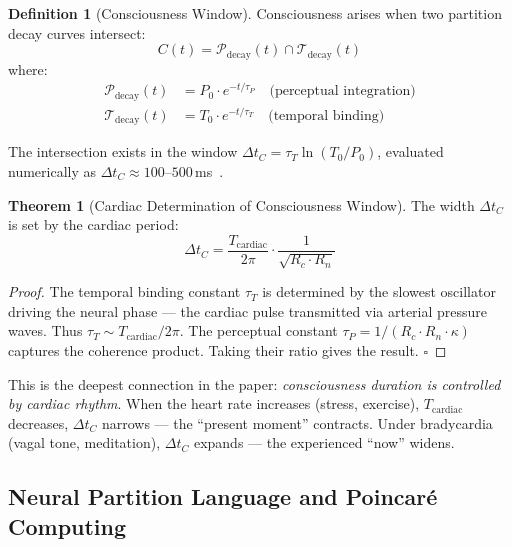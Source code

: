 \documentclass[10pt,twocolumn,a4paper]{article}
\theoremstyle{definition}
\newtheorem{theorem}{Theorem}
\newtheorem{definition}{Definition}
\begin{document}
\begin{definition}[Consciousness Window]
Consciousness arises when two partition decay curves intersect:
\begin{equation}
\boxed{C(t) = \mathcal{P}_{\text{decay}}(t) \cap \mathcal{T}_{\text{decay}}(t)}
\end{equation}
where:
\begin{align}
\mathcal{P}_{\text{decay}}(t) &= P_0 \cdot e^{-t/\tau_P} \quad \text{(perceptual integration)}\\
\mathcal{T}_{\text{decay}}(t) &= T_0 \cdot e^{-t/\tau_T} \quad \text{(temporal binding)}
\end{align}
\end{definition}

The intersection exists in the window $\Delta t_C = \tau_T \ln(T_0/P_0)$,
evaluated numerically as $\Delta t_C \approx 100$--$500$\,ms~\cite{libet1983time,sergent2005timing,pockett2002nature}.

\begin{theorem}[Cardiac Determination of Consciousness Window]
The width $\Delta t_C$ is set by the cardiac period:
\begin{equation}
\Delta t_C = \frac{T_{\text{cardiac}}}{2\pi} \cdot \frac{1}{\sqrt{R_c \cdot R_n}}
\end{equation}
\end{theorem}

\begin{proof}
The temporal binding constant $\tau_T$ is determined by the slowest oscillator
driving the neural phase — the cardiac pulse transmitted via arterial pressure
waves. Thus $\tau_T \sim T_{\text{cardiac}}/2\pi$. The perceptual constant
$\tau_P = 1/(R_c \cdot R_n \cdot \kappa)$ captures the coherence product.
Taking their ratio gives the result. $\square$
\end{proof}

This is the deepest connection in the paper: \emph{consciousness duration is
controlled by cardiac rhythm}. When the heart rate increases (stress, exercise),
$T_{\text{cardiac}}$ decreases, $\Delta t_C$ narrows — the ``present moment''
contracts. Under bradycardia (vagal tone, meditation), $\Delta t_C$ expands —
the experienced ``now'' widens.

\subsection{Neural Partition Language and Poincaré Computing}
\end{document}

